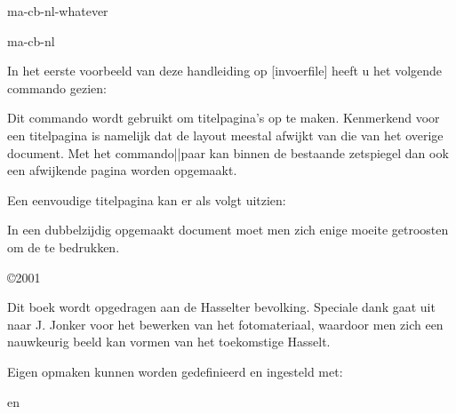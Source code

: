 \startonderdeel ma-cb-nl-whatever

\produkt ma-cb-nl





In het eerste voorbeeld van deze handleiding op
[invoerfile] heeft u het volgende commando
gezien:


Dit commando wordt gebruikt om titelpagina's op te maken.
Kenmerkend voor een titelpagina is namelijk dat de layout
meestal afwijkt van die van het overige document. Met het
commando||paar  kan
binnen de bestaande zetspiegel dan ook een afwijkende pagina
worden opgemaakt.

Een eenvoudige titelpagina kan er als volgt uitzien:

\startbuffer
\startstandaardopmaak
\blanko
{}
\blanko
{}
\vfill
{}
\stopstandaardopmaak
\stopbuffer

\typebuffer

In een dubbelzijdig opgemaakt document moet men zich enige
moeite getroosten om de  te bedrukken.

\startbuffer
\startstandaardopmaak[dubbelzijdig=nee]
\blanko
{}
\blanko
{}
\vfill
{}
\stopstandaardopmaak
\startstandaardopmaak[pagina=nee]
\vfill
\copyright 2001

Dit boek wordt opgedragen aan de Hasselter bevolking.
Speciale dank gaat uit naar J. Jonker voor het bewerken van
het fotomateriaal, waardoor men zich een nauwkeurig beeld
kan vormen van het toekomstige Hasselt.
\stopstandaardopmaak
\stopbuffer

\typebuffer

Eigen opmaken kunnen worden gedefinieerd en ingesteld met:


en



